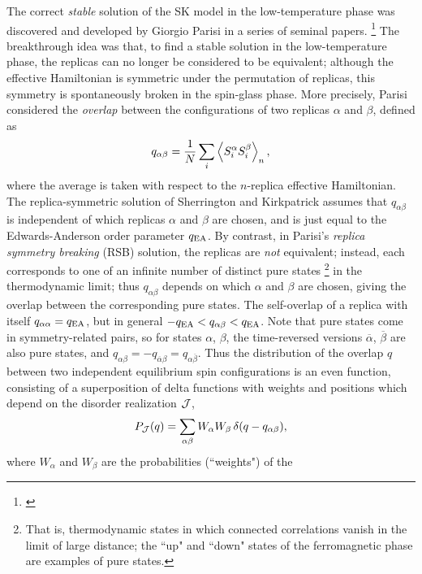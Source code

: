 The correct \emph{stable} solution of the SK model in the low-temperature phase
was discovered and developed by Giorgio Parisi in a series of seminal papers.%
\footnote{%
  \textcite{%
    parisi1979infinite,
    parisi1980magnetic,
    parisi1980order,
    parisi1983order,
  }
}
The breakthrough idea was that, to find a stable solution in the
low-temperature phase, the replicas can no longer be considered to be
equivalent; although the effective Hamiltonian is symmetric under the
permutation of replicas, this symmetry is spontaneously broken in the
spin-glass phase. More precisely, Parisi considered the \emph{overlap} between
the configurations of two replicas $\alpha$ and $\beta$, defined as
\begin{equation}
  q_{\alpha\beta} = \frac{1}{N} \sum_i \left< S_i^{\alpha} S_i^{\beta} \right>_n,
\end{equation}
where the average is taken with respect to the $n$-replica effective
Hamiltonian. The replica-symmetric solution of Sherrington and Kirkpatrick
assumes that $q_{\alpha\beta}$ is independent of which replicas $\alpha$ and
$\beta$ are chosen, and is just equal to the Edwards-Anderson order parameter
$q_{\mathrm{EA}}$. By contrast, in Parisi's \emph{replica symmetry breaking} (RSB)
solution, the replicas are \emph{not} equivalent; instead, each corresponds to
one of an infinite number of distinct pure states%
\footnote{%
  That is, thermodynamic states in which connected correlations vanish in the
  limit of large distance; the ``up" and ``down" states of the ferromagnetic
  phase are examples of pure states.
}
in the thermodynamic limit; thus $q_{\alpha\beta}$ depends on which $\alpha$
and $\beta$ are chosen, giving the overlap between the corresponding pure
states. The self-overlap of a replica with itself $q_{\alpha\alpha}=q_{\mathrm{EA}}$, but
in general $-q_{\mathrm{EA}} < q_{\alpha\beta} < q_{\mathrm{EA}}$. Note that pure states come in
symmetry-related pairs, so for states $\alpha$, $\beta$, the time-reversed
versions $\overline{\alpha}$, $\overline{\beta}$ are also pure states, and
$q_{\alpha\beta}=-q_{\overline{\alpha}\beta}=q_{\alpha\overline{\beta}}$. Thus
the distribution of the overlap $q$ between two independent equilibrium spin
configurations is an even function, consisting of a superposition of delta
functions with weights and positions which depend on the disorder realization
$\mathcal{J}$,
\begin{equation}
  P_{\mathcal{J}}(q) = \sum_{\alpha\beta} W_{\alpha} W_{\beta}\,\delta(q - q_{\alpha\beta}),
\end{equation}
where $W_{\alpha}$ and $W_{\beta}$ are the probabilities (``weights") of the
